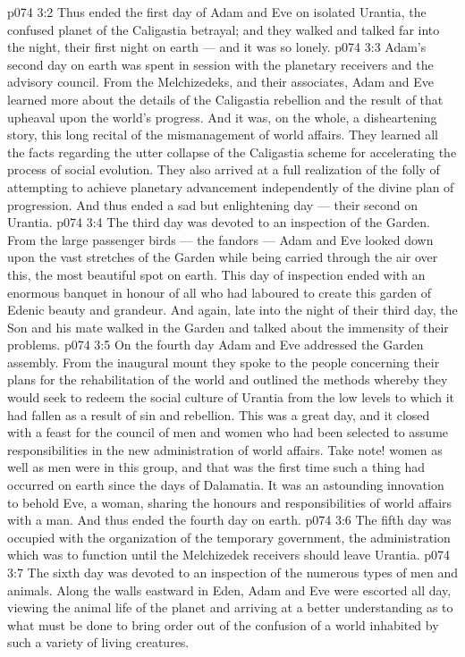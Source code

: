 \vs p074 3:2 Thus ended the first day of Adam and Eve on isolated Urantia, the confused planet of the Caligastia betrayal; and they walked and talked far into the night, their first night on earth --- and it was so lonely.
\vs p074 3:3 \pc Adam’s second day on earth was spent in session with the planetary receivers and the advisory council. From the Melchizedeks, and their associates, Adam and Eve learned more about the details of the Caligastia rebellion and the result of that upheaval upon the world’s progress. And it was, on the whole, a disheartening story, this long recital of the mismanagement of world affairs. They learned all the facts regarding the utter collapse of the Caligastia scheme for accelerating the process of social evolution. They also arrived at a full realization of the folly of attempting to achieve planetary advancement independently of the divine plan of progression. And thus ended a sad but enlightening day --- their second on Urantia.
\vs p074 3:4 \pc The third day was devoted to an inspection of the Garden. From the large passenger birds --- the fandors --- Adam and Eve looked down upon the vast stretches of the Garden while being carried through the air over this, the most beautiful spot on earth. This day of inspection ended with an enormous banquet in honour of all who had laboured to create this garden of Edenic beauty and grandeur. And again, late into the night of their third day, the Son and his mate walked in the Garden and talked about the immensity of their problems.
\vs p074 3:5 \pc On the fourth day Adam and Eve addressed the Garden assembly. From the inaugural mount they spoke to the people concerning their plans for the rehabilitation of the world and outlined the methods whereby they would seek to redeem the social culture of Urantia from the low levels to which it had fallen as a result of sin and rebellion. This was a great day, and it closed with a feast for the council of men and women who had been selected to assume responsibilities in the new administration of world affairs. Take note! women as well as men were in this group, and that was the first time such a thing had occurred on earth since the days of Dalamatia. It was an astounding innovation to behold Eve, a woman, sharing the honours and responsibilities of world affairs with a man. And thus ended the fourth day on earth.
\vs p074 3:6 \pc The fifth day was occupied with the organization of the temporary government, the administration which was to function until the Melchizedek receivers should leave Urantia.
\vs p074 3:7 \pc The sixth day was devoted to an inspection of the numerous types of men and animals. Along the walls eastward in Eden, Adam and Eve were escorted all day, viewing the animal life of the planet and arriving at a better understanding as to what must be done to bring order out of the confusion of a world inhabited by such a variety of living creatures.
